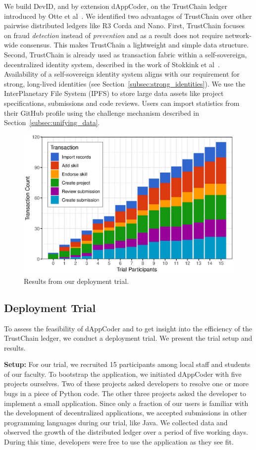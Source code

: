 We build DevID, and by extension dAppCoder, on the TrustChain ledger introduced by Otte et al~\cite{otte2017trustchain}.
We identified two advantages of TrustChain over other pairwise distributed ledgers like R3 Corda and Nano.
First, TrustChain focuses on fraud \emph{detection} instead of \emph{prevention} and as a result does not require network-wide consensus.
This makes TrustChain a lightweight and simple data structure.
Second, TrustChain is already used as transaction fabric within a self-sovereign, decentralized identity system, described in the work of Stokkink et al~\cite{stokkink2018deployment}.
Availability of a self-sovereign identity system aligns with our requirement for strong, long-lived identities (see Section~\ref{subsec:strong_identities}).
We use the InterPlanetary File System (IPFS) to store large data assets like project specifications, submissions and code reviews.
Users can import statistics from their GitHub profile using the challenge mechanism described in Section~\ref{subsec:unifying_data}.

\begin{figure}[t!]
	\includegraphics[width=.75\columnwidth]{devid/resources/experiment/experiment_1_unit.eps}
	\caption{Results from our deployment trial.}
	\label{fig:experiment_graph}
\end{figure}

\subsection{Deployment Trial}
To assess the feasibility of dAppCoder and to get insight into the efficiency of the TrustChain ledger, we conduct a deployment trial.
We present the trial setup and results.

\textbf{Setup:}
For our trial, we recruited 15 participants among local staff and students of our faculty.
To bootstrap the application, we initiated dAppCoder with five projects ourselves.
Two of these projects asked developers to resolve one or more bugs in a piece of Python code.
The other three projects asked the developer to implement a small application.
Since only a fraction of our users is familiar with the development of decentralized applications, we accepted submissions in other programming languages during our trial, like Java.
We collected data and observed the growth of the distributed ledger over a period of five working days.
During this time, developers were free to use the application as they see fit.

